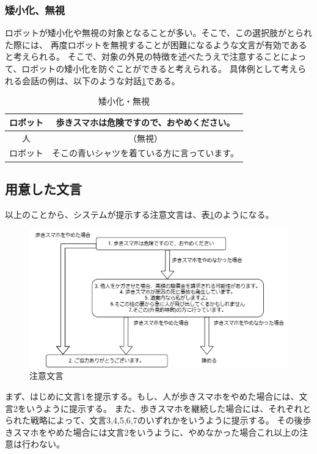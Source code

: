 \documentclass[11pt,a4j]{jreport}
\begin{document}
\subsubsection{矮小化、無視}
ロボットが矮小化や無視の対象となることが多い\cite{Schneider2022}。そこで、この選択肢がとられた際には、
再度ロボットを無視することが困難になるような文言が有効であると考えられる。
そこで、対象の外見の特徴を述べたうえで注意することによって、ロボットの矮小化を防ぐことができると考えられる。
具体例として考えられる会話の例は、以下のような対話\ref{dialogue: Ignore}である。
\begin{table}[h]
  \centering
  
  
  \begin{tabular}{c|c}
      ロボット & 歩きスマホは危険ですので、おやめください。 \\ \hline
      人 & （無視） \\ \hline
      ロボット & そこの青いシャツを着ている方に言っています。 \\ 
  \end{tabular}
  \caption{矮小化・無視}
  \label{dialogue: Ignore}
\end{table}


\subsection{用意した文言}
以上のことから、システムが提示する注意文言は、表\ref{fig: Strategy}のようになる。
\begin{figure}[H]
  
  \includegraphics[width=15cm]{img/waystostop.drawio.png}
  \caption{注意文言}
  \label{fig: Strategy}

\end{figure}
まず、はじめに文言1を提示する。もし、人が歩きスマホをやめた場合には、文言2をいうように提示する。
また、歩きスマホを継続した場合には、それぞれとられた戦略によって、文言3,4,5,6,7のいずれかをいうように提示する。
その後歩きスマホをやめた場合には文言2をいうように、やめなかった場合これ以上の注意は行わない。
\end{document}
